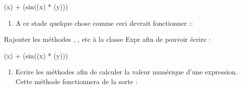 \documentclass[letterpaper,10pt,english]{sphinxhowto}
\begin{document}
\begin{sphinxVerbatim}[commandchars=\\\{\}]
\PYGZsq{}(x) + (sin((x) * (y)))\PYGZsq{}
\end{sphinxVerbatim}
\begin{enumerate}
%
\setcounter{enumi}{5}
\item {} 
\sphinxAtStartPar
A ce stade quelque chose comme ceci devrait fonctionner ::

\end{enumerate}

\begin{sphinxVerbatim}[commandchars=\\\{\}]
  
  
  
\end{sphinxVerbatim}

\sphinxAtStartPar
Rajouter les méthodes , , etc à la classe Expr afin de pouvoir écrire :

\begin{sphinxVerbatim}[commandchars=\\\{\}]
  
\end{sphinxVerbatim}

\begin{sphinxVerbatim}[commandchars=\\\{\}]
  
\end{sphinxVerbatim}

\begin{sphinxVerbatim}[commandchars=\\\{\}]
(x) + (sin((x) * (y)))
\end{sphinxVerbatim}
\begin{enumerate}
%
\setcounter{enumi}{6}
\item {} 
\sphinxAtStartPar
Ecrire les méthodes  afin de calculer la valeur numérique d’une expression. Cette méthode fonctionnera de la sorte :

\end{enumerate}
\end{document}
